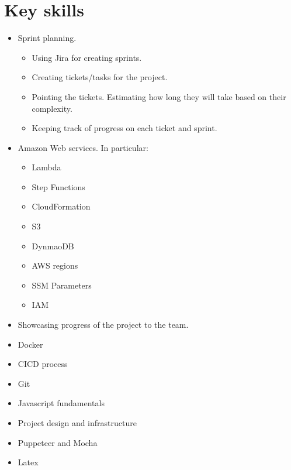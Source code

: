 \documentclass[12pt,a4paper,titlepage]{report}
\begin{document}
\section{Key skills}
\begin{itemize}
  \item Sprint planning. 
    \begin{itemize}
      \item Using Jira for creating sprints.
      \item Creating tickets/tasks for the project.
      \item Pointing the tickets. Estimating how long they will take based on their complexity.
      \item Keeping track of progress on each ticket and sprint.
    \end{itemize}
  \item Amazon Web services. In particular:
    \begin{itemize}
      \item Lambda 
      \item Step Functions 
      \item CloudFormation 
      \item S3 
      \item DynmaoDB 
      \item AWS regions 
      \item SSM Parameters
      \item IAM
    \end{itemize}
  \item Showcasing progress of the project to the team.
  \item Docker
  \item CICD process
  \item Git
  \item Javascript fundamentals
  \item Project design and infrastructure
  \item Puppeteer and Mocha
  \item Latex
\end{itemize}
\end{document}
